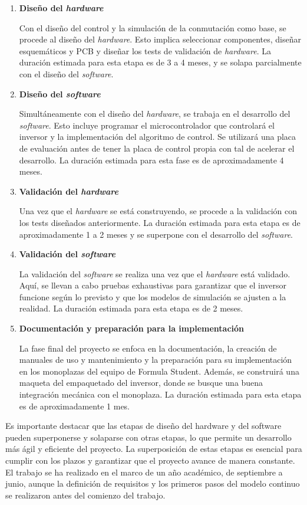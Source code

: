 \begin{enumerate}
\item \textbf{Diseño del \textit{hardware}}

Con el diseño del control y la simulación de la conmutación como base, se procede al diseño del \textit{hardware}. Esto implica seleccionar componentes, diseñar esquemáticos y PCB y diseñar los tests de validación de \textit{hardware}. La duración estimada para esta etapa es de 3 a 4 meses, y se solapa parcialmente con el diseño del \textit{software}.

\item \textbf{Diseño del \textit{software}}

Simultáneamente con el diseño del \textit{hardware}, se trabaja en el desarrollo del \textit{software}. Esto incluye programar el microcontrolador que controlará el inversor y la implementación del algoritmo de control. Se utilizará una placa de evaluación antes de tener la placa de control propia con tal de acelerar el desarrollo. La duración estimada para esta fase es de aproximadamente 4 meses.

\item \textbf{Validación del \textit{hardware}}

Una vez que el \textit{hardware} se está construyendo, se procede a la validación con los tests diseñados anteriormente. La duración estimada para esta etapa es de aproximadamente 1 a 2 meses y se superpone con el desarrollo del \textit{software}.

\item \textbf{Validación del \textit{software}}

La validación del \textit{software} se realiza una vez que el \textit{hardware} está validado. Aquí, se llevan a cabo pruebas exhaustivas para garantizar que el inversor funcione según lo previsto y que los modelos de simulación se ajusten a la realidad. La duración estimada para esta etapa es de 2 meses.

\item \textbf{Documentación y preparación para la implementación}

La fase final del proyecto se enfoca en la documentación, la creación de manuales de uso y mantenimiento y la preparación para su implementación en los monoplazas del equipo de Formula Student. Además, se construirá una maqueta del empaquetado del inversor, donde se busque una buena integración mecánica con el monoplaza. La duración estimada para esta etapa es de aproximadamente 1 mes. 

\end{enumerate}

Es importante destacar que las etapas de diseño del hardware y del software pueden superponerse y solaparse con otras etapas, lo que permite un desarrollo más ágil y eficiente del proyecto. La superposición de estas etapas es esencial para cumplir con los plazos y garantizar que el proyecto avance de manera constante. El trabajo se ha realizado en el marco de un año académico, de septiembre a junio, aunque la definición de requisitos y los primeros pasos del modelo continuo se realizaron antes del comienzo del trabajo.


